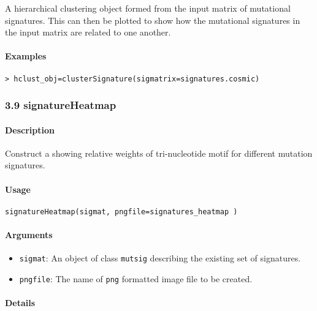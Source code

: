 \documentclass[]{article}
\providecommand{\tightlist}{%
  \setlength{\itemsep}{0pt}\setlength{\parskip}{0pt}}
\let\oldparagraph\paragraph
\renewcommand{\paragraph}[1]{\oldparagraph{#1}\mbox{}}
\begin{document}
A hierarchical clustering object formed from the input matrix of
mutational signatures. This can then be plotted to show how the
mutational signatures in the input matrix are related to one another.

\paragraph{\texorpdfstring{\textbf{Examples}}{Examples}}\label{examples-7}

\begin{verbatim}
> hclust_obj=clusterSignature(sigmatrix=signatures.cosmic) 
\end{verbatim}

\subsubsection{3.9 signatureHeatmap}\label{signatureheatmap}

\paragraph{\texorpdfstring{\textbf{Description}}{Description}}\label{description-7}

Construct a  showing relative weights of tri-nucleotide motif for
different mutation signatures.

\paragraph{\texorpdfstring{\textbf{Usage}}{Usage}}\label{usage-8}

\texttt{signatureHeatmap(sigmat,\ pngfile=\textquotesingle{}signatures\_heatmap\textquotesingle{}\ )}

\paragraph{\texorpdfstring{\textbf{Arguments
}}{Arguments }}\label{arguments-7}

\begin{itemize}
\tightlist
\item
  \texttt{sigmat}: An object of class \texttt{mutsig} describing the
  existing set of signatures.
\item
  \texttt{pngfile}: The name of \texttt{png} formatted image file to be
  created.
\end{itemize}

\paragraph{\texorpdfstring{\textbf{Details}}{Details}}\label{details-5}
\end{document}
